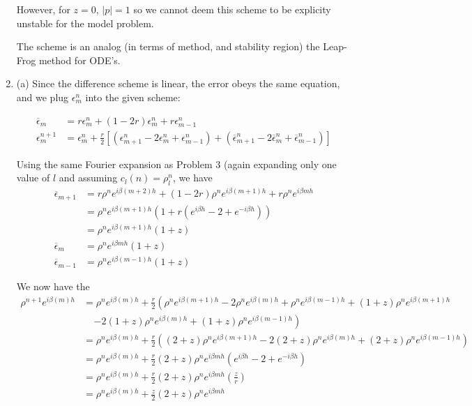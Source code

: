 \documentclass[11pt]{article}
\def\f{\frac }
\begin{document}
\begin{enumerate}
However, for $z = 0$, $|p| = 1$ so we cannot deem this scheme to be explicity unstable for the model problem.

The scheme is an analog (in terms of method, and stability region) the Leap-Frog method for ODE's.

\item (a) Since the difference scheme is linear, the error obeys the same equation, and we plug $\epsilon _{m} ^{n}$ into the given scheme:

\begin{align} \overline{\epsilon} _m &= r \epsilon _{m} ^{n} + (1-2r) \epsilon _{m} ^{n} + r \epsilon _{m-1} ^{n}\\
\epsilon _{m} ^{n+1} &=  \epsilon _{m} ^{n} + \f{r}{2} \left [ \left ( \epsilon _{m+1} ^{n} -2 \epsilon _{m} ^{n} + \epsilon _{m-1} ^{n} \right ) + \left ( \overline{\epsilon} _{m+1} ^{n} -2 \overline{\epsilon} _{m} ^{n} + \overline{\epsilon} _{m-1} ^{n} \right ) \right ]\end{align}

Using the same Fourier expansion as Problem 3 (again expanding only one value of $l$ and assuming $c_l (n) = \rho_l ^n$, we have
\begin{align} \overline{\epsilon} _{m+1} &= r\rho ^{n} e^{i \beta (m+2) h}  + (1-2r) \rho ^{n} e^{i \beta (m+1) h} + r \rho ^{n} e^{i \beta m h}\\
&= \rho ^{n} e^{i \beta (m+1) h}  \left ( 1+  r \left (  e^{i \beta h} - 2 + e^{-i \beta h} \right ) \right ) \\ 
&= \rho ^{n} e^{i \beta (m+1) h}  \left ( 1+  z \right ) \\ 
\overline{\epsilon} _{m} &= \rho ^{n} e^{i \beta m h}  \left ( 1+  z \right ) \\ 
\overline{\epsilon} _{m-1} &= \rho ^{n} e^{i \beta (m-1) h}  \left ( 1+  z \right ) \end{align}

We now have the
\begin{align*} \rho ^{n+1} e^{i \beta (m) h} &= \rho ^{n} e^{i \beta (m) h} + \f{r}{2} \left ( \rho ^{n} e^{i \beta (m+1) h} -2 \rho ^{n} e^{i \beta (m) h} + \rho ^{n} e^{i \beta (m-1) h} + (1+z) \rho ^{n} e^{i \beta (m+1) h} \right.\\
&~~~~~ \left. -2 (1+z) \rho ^{n} e^{i \beta (m) h} + (1+z) \rho ^{n} e^{i \beta (m-1) h} \right ) \\
&= \rho ^{n} e^{i \beta (m) h} + \f{r}{2} \left ( (2+z) \rho ^{n} e^{i \beta (m+1) h} -2 (2+z) \rho ^{n} e^{i \beta (m) h} + (2+z) \rho ^{n} e^{i \beta (m-1) h} \right ) \\
&= \rho ^{n} e^{i \beta (m) h} + \f{r}{2} (2+z) \rho ^{n} e^{i \beta m h}\left (  e^{i \beta h} -2 + e^{-i \beta h} \right ) \\
&= \rho ^{n} e^{i \beta (m) h} + \f{r}{2} (2+z) \rho ^{n} e^{i \beta m h}\left (  \f{z}{r} \right ) \\
&= \rho ^{n} e^{i \beta (m) h} + \f{z}{2} (2+z) \rho ^{n} e^{i \beta m h}\end{align*}


\end{enumerate}
\end{document}
